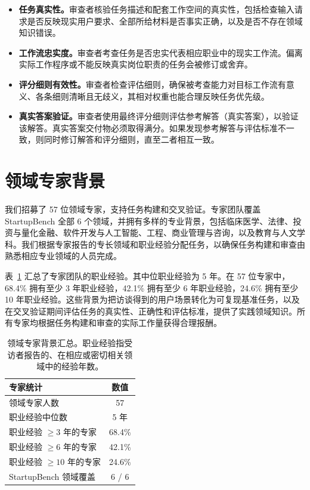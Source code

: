 \begin{itemize}
\item \textbf{任务真实性。}审查者核验任务描述和配套工作空间的真实性，包括检查输入请求是否反映现实用户要求、全部所给材料是否事实正确，以及是否不存在领域知识错误。

\item \textbf{工作流忠实度。}审查者考查任务是否忠实代表相应职业中的现实工作流。偏离实际工作程序或不能反映真实岗位职责的任务会被修订或舍弃。

\item \textbf{评分细则有效性。}审查者检查评估细则，确保被考查能力对目标工作流有意义、各条细则清晰且无歧义，其相对权重也能合理反映任务优先级。

\item \textbf{真实答案验证。}审查者使用最终评分细则评估参考解答（真实答案），以验证该解答。真实答案交付物必须取得满分。如果发现参考解答与评估标准不一致，则同时修订解答和评分细则，直至二者相互一致。
\end{itemize}

\section{领域专家背景}
\label{app:expert background}
我们招募了 57 位领域专家，支持任务构建和交叉验证。专家团队覆盖 StartupBench 全部 6 个领域，并拥有多样的专业背景，包括临床医学、法律、投资与量化金融、软件开发与人工智能、工程、商业管理与咨询，以及教育与人文学科。我们根据专家报告的专长领域和职业经验分配任务，以确保任务构建和审查由熟悉相应专业领域的人员完成。

表~\ref{tab:expert_background} 汇总了专家团队的职业经验。其中位职业经验为 5 年。在 57 位专家中，68.4\% 拥有至少 3 年职业经验，42.1\% 拥有至少 6 年职业经验，24.6\% 拥有至少 10 年职业经验。这些背景为把访谈得到的用户场景转化为可复现基准任务，以及在交叉验证期间评估任务的真实性、正确性和评估标准，提供了实践领域知识。所有专家均根据任务构建和审查的实际工作量获得合理报酬。

\begin{table}[t]
\centering
\small
\caption{领域专家背景汇总。职业经验指受访者报告的、在相应或密切相关领域中的经验年数。}
\label{tab:expert_background}
\begin{tabular}{lc}
\toprule
\textbf{专家统计} & \textbf{数值} \\
\midrule
领域专家人数 & 57 \\
职业经验中位数 & 5 年 \\
职业经验 $\geq 3$ 年的专家 & 68.4\% \\
职业经验 $\geq 6$ 年的专家 & 42.1\% \\
职业经验 $\geq 10$ 年的专家 & 24.6\% \\
StartupBench 领域覆盖 & 6 / 6 \\
\bottomrule
\end{tabular}
\end{table}

